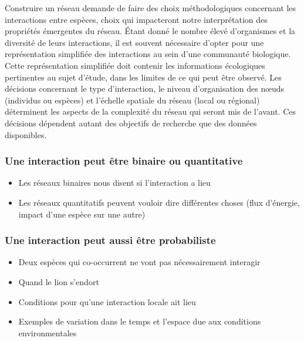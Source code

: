 Construire un réseau demande de faire des choix méthodologiques concernant les
interactions entre espèces, choix qui impacteront notre interprétation des
propriétés émergentes du réseau. Étant donné le nombre élevé d'organismes et la
diversité de leurs interactions, il est souvent nécessaire d'opter pour une
représentation simplifiée des interactions au sein d'une communauté biologique.
Cette représentation simplifiée doit contenir les informations écologiques
pertinentes au sujet d'étude, dans les limites de ce qui peut être observé. Les
décisions concernant le type d'interaction, le niveau d'organisation des nœuds
(individus ou espèces) et l'échelle spatiale du réseau (local ou régional)
déterminent les aspects de la complexité du réseau qui seront mis de l'avant.
Ces décisions dépendent autant des objectifs de recherche que des données
disponibles.

\subsubsection{Une interaction peut être binaire ou quantitative} 

\begin{itemize}
    \item Les réseaux binaires nous disent si l'interaction a lieu
    \item Les réseaux quantitatifs peuvent vouloir dire différentes choses (flux d'énergie, impact d'une espèce sur une autre)
\end{itemize}

\subsubsection{Une interaction peut aussi être probabiliste} 

\begin{itemize}
    \item Deux espèces qui co-occurrent ne vont pas nécessairement interagir
    \item Quand le lion s'endort 
    \item Conditions pour qu'une interaction locale ait lieu 
    \item Exemples de variation dans le temps et l'espace due aux conditions environmentales 
\end{itemize}

